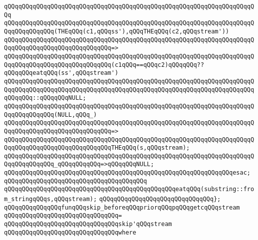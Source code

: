 \verb|qQQqqQQqqQQqqQQqqQQqqQQqqQQqqQQqqQQqqQQqqQQqqQQqqQQqqQQqqQQqqQQqqQQqqQQq|\newline
\verb|qQQqqQQqqQQqqQQqqQQqqQQqqQQqqQQqqQQqqQQqqQQqqQQqqQQqqQQqqQQqqQQqqQQqqQQqqQQqqQQqqQQq(THEqQQq(c1,qQQqss'),qQQqTHEqQQq(c2,qQQqstream'))|\newline
\verb|qQQqqQQqqQQqqQQqqQQqqQQqqQQqqQQqqQQqqQQqqQQqqQQqqQQqqQQqqQQqqQQqqQQqqQQqqQQqqQQqqQQqqQQqqQQqqQQqqQQq=>|\newline
\verb|qQQqqQQqqQQqqQQqqQQqqQQqqQQqqQQqqQQqqQQqqQQqqQQqqQQqqQQqqQQqqQQqqQQqqQQqqQQqqQQqqQQqqQQqqQQqqQQqqQQq(c1qQQq==qQQqc2)qQQqqQQq??qQQqqQQqeatqQQq(ss',qQQqstream')|\newline
\verb|qQQqqQQqqQQqqQQqqQQqqQQqqQQqqQQqqQQqqQQqqQQqqQQqqQQqqQQqqQQqqQQqqQQqqQQqqQQqqQQqqQQqqQQqqQQqqQQqqQQqqQQqqQQqqQQqqQQqqQQqqQQqqQQqqQQqqQQqqQQqqQQqqQQq::qQQqqQQqNULL;|\newline
\newline
\verb|qQQqqQQqqQQqqQQqqQQqqQQqqQQqqQQqqQQqqQQqqQQqqQQqqQQqqQQqqQQqqQQqqQQqqQQqqQQqqQQqqQQq(NULL,qQQq_)|\newline
\verb|qQQqqQQqqQQqqQQqqQQqqQQqqQQqqQQqqQQqqQQqqQQqqQQqqQQqqQQqqQQqqQQqqQQqqQQqqQQqqQQqqQQqqQQqqQQqqQQqqQQq=>|\newline
\verb|qQQqqQQqqQQqqQQqqQQqqQQqqQQqqQQqqQQqqQQqqQQqqQQqqQQqqQQqqQQqqQQqqQQqqQQqqQQqqQQqqQQqqQQqqQQqqQQqqQQqTHEqQQq(s,qQQqstream);|\newline
\newline
\verb|qQQqqQQqqQQqqQQqqQQqqQQqqQQqqQQqqQQqqQQqqQQqqQQqqQQqqQQqqQQqqQQqqQQqqQQqqQQqqQQqqQQq_qQQqqQQqqQQq=>qQQqqQQqNULL;|\newline
\verb|qQQqqQQqqQQqqQQqqQQqqQQqqQQqqQQqqQQqqQQqqQQqqQQqqQQqqQQqqQQqqQQqesac;|\newline
\newline
\verb|qQQqqQQqqQQqqQQqqQQqqQQqqQQqqQQqqQQqqQQq|\newline
\verb|qQQqqQQqqQQqqQQqqQQqqQQqqQQqqQQqqQQqqQQqqQQqqQQqeatqQQq(substring::from_stringqQQqs,qQQqstream);|\newline
\verb|qQQqqQQqqQQqqQQqqQQqqQQqqQQqqQQq};|\newline
\newline
\newline
\verb|qQQqqQQqqQQqqQQqfunqQQqskip_beforeqQQqpriorqQQqpqQQqgetcqQQqstream|\newline
\verb|qQQqqQQqqQQqqQQqqQQqqQQqqQQqqQQq=|\newline
\verb|qQQqqQQqqQQqqQQqqQQqqQQqqQQqqQQqskip'qQQqstream|\newline
\verb|qQQqqQQqqQQqqQQqqQQqqQQqqQQqqQQqwhere|\newline
